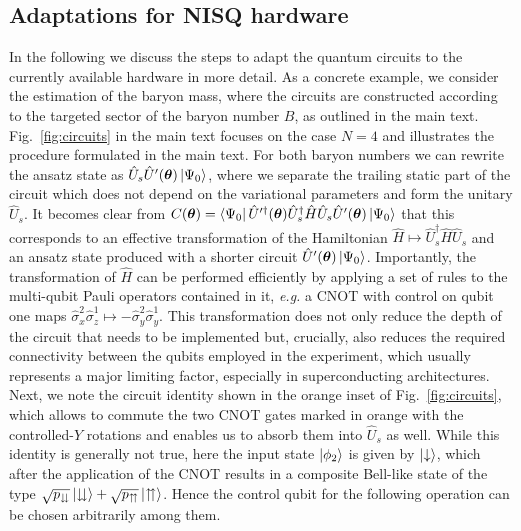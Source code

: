 \documentclass[twocolumn,aps,showpacs,prb,superscriptaddress,floatfix,10pt,nofootinbib]{revtex4-2}
\begin{document}
\subsection{Adaptations for NISQ hardware}
\label{meth:adaptionsNISQ}
In the following we discuss the steps to adapt the quantum circuits to the currently available hardware in more detail. 
As a concrete example, we consider the estimation of the baryon mass, where the circuits are constructed according to the targeted sector of the baryon number $B$, as outlined in the main text. Fig.~\ref{fig:circuits} in the main text focuses on the case $N=4$ and illustrates the procedure formulated in the main text. 
For both baryon numbers we can rewrite the ansatz state as $\hat{U}_s \hat{U}^\prime(\boldsymbol{\theta})\ket{\Psi_0}$, where we separate the trailing static part of the circuit which does not depend on the variational parameters and form the unitary $\hat{U}_s$. 
It becomes clear from $C(\boldsymbol{\theta})=\bra{\Psi_0}\hat{U}^{\prime\dagger}(\boldsymbol{\theta})\hat{U}_s^\dagger \hat{H} \hat{U}_s \hat{U}^\prime(\boldsymbol{\theta}) \ket{\Psi_0}$ that this corresponds to an effective transformation of the Hamiltonian $\hat{H}\mapsto \hat{U}_s^\dagger \hat{H} \hat{U}_s$ and an ansatz state produced with a shorter circuit $\hat{U}^\prime(\boldsymbol{\theta})\ket{\Psi_0}$.
Importantly, the transformation of $\hat{H}$ can be performed efficiently by applying a set of rules to the multi-qubit Pauli operators contained in it, \textit{e.g.} a CNOT with control on qubit one maps $\hat{\sigma}_x^2\hat{\sigma}_z^1 \mapsto -\hat{\sigma}_y^2\hat{\sigma}_y^1$.
This transformation does not only reduce the depth of the circuit that needs to be implemented but, crucially, also reduces the required connectivity between the qubits employed in the experiment, which usually represents a major limiting factor, especially in superconducting architectures.
Next, we note the circuit identity shown in the orange inset of Fig.~\ref{fig:circuits}, which allows to commute the two CNOT gates marked in orange with the controlled-$Y$ rotations and enables us to absorb them into $\hat{U}_s$ as well. While this identity is generally not true, here the input state $\ket{\phi_2}$ is given by $\ket{\downarrow}$, which after the application of the CNOT results in a composite Bell-like state of the type $\sqrt{p_{\downdownarrows}}\ket{\downdownarrows} + \sqrt{p_{\upuparrows}}\ket{\upuparrows}$. Hence the control qubit for the following operation can be chosen arbitrarily among them. 
\end{document}
